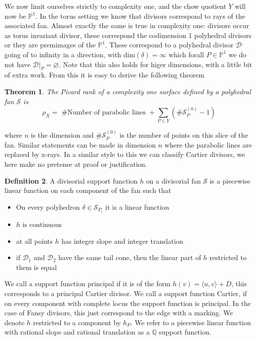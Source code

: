 \documentclass[12pt,a4paper]{book}      %
\newtheorem{thm}{Theorem}[section]
\theoremstyle{definition}
\newtheorem{dfn}[thm]{Definition}
\begin{document}
We now limit ourselves strictly to complexity one, and the chow quotient $Y$ will now be $\mathbb{P}^1$. In the torus setting we know that divisors correspond to rays of the associated fan. Almost exactly the same is true in complexity one: divisors  occur as torus invariant divisor, these correspond the codimension 1 polyhedral divisors or they are premimages of the $\mathbb{P}^1$. These correspond to a polyhedral divisor $\mathcal{D}$  going of to infinity in a direction, with dim$(\delta) = \infty$ which forall $P \in \mathbb{P}^1$ we do not have $\mathcal{D}  |_P = \varnothing$. Note that this also holds for higer dimensions, with a little bit of extra work. From this it is easy to derive the following theorem
\\
\begin{thm}\cite{Suss}
The Picard rank of a complexity one surface defined by a polyhedral fan $\mathcal{S}$ is 
\[
\rho_X =  \text{ \# Number of parabolic lines } + \sum_{P \in Y} (\# \mathcal{S}_P^{(0)} - 1) 
\]
\end{thm}
where $n$ is the dimension and $\# \mathcal{S}_P^{(0)}$ is the number of points on this slice of the fan. Similar statements can be made in dimension $n$ where the parabolic lines are replaced by x-rays. In a similar style to this we can classify Cartier divisors, we here make no pretense at proof or justification. 
\begin{dfn}
A divisorial support function $h$ on a divisorial fan $\mathcal{S}$ is a piecewise linear function on each component of the fan such that

\begin{itemize}
\item On every polyhedron $\delta \in \mathcal{S}_{P_i}$ it is a linear function
\item $h$ is continuous
\item at all points $h$ has integer slope and integer translation
\item if $\mathcal{D}_1$ and $\mathcal{D}_2$ have the same tail cone, then the linear part of $h$ restricted to them is equal
\end{itemize}
\end{dfn}
We call a support function principal if it is of the form $h(v) = \langle u, v \rangle + D$, this corresponds to a principal Cartier divisor. We call a support function Cartier, if on every component with complete locus the support function is principal. In the case of Fansy divisors, this just correspond to the edge with a marking. We denote $h$ restricted to a component by $h_P$.  We refer to a piecewise linear function with rational slope and rational translation as a $\mathbb{Q}$ support function.
\end{document}
